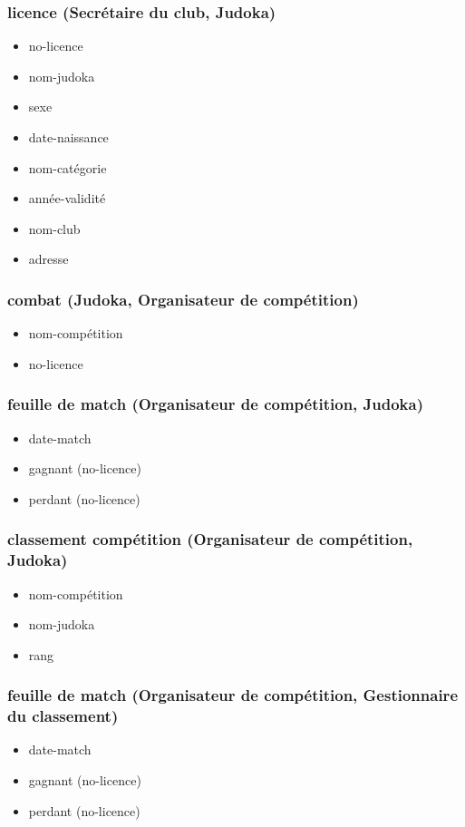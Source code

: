 \subsubsection*{licence (Secrétaire du club, Judoka)}
\begin{itemize}
    \item no-licence
    \item nom-judoka
    \item sexe
    \item date-naissance
    \item nom-catégorie
    \item année-validité
    \item nom-club
    \item adresse
\end{itemize}

\subsubsection*{combat (Judoka, Organisateur de compétition)}
\begin{itemize}
    \item nom-compétition
    \item no-licence
\end{itemize}

\subsubsection*{feuille de match (Organisateur de compétition, Judoka)}
\begin{itemize}
    \item date-match
    \item gagnant (no-licence)
    \item perdant (no-licence)
\end{itemize}

\subsubsection*{classement compétition (Organisateur de compétition, Judoka)}
\begin{itemize}
    \item nom-compétition
    \item nom-judoka
    \item rang
\end{itemize}

\subsubsection*{feuille de match (Organisateur de compétition, Gestionnaire du classement)}
\begin{itemize}
    \item date-match
    \item gagnant (no-licence)
    \item perdant (no-licence)
\end{itemize}

